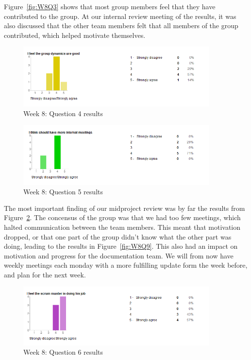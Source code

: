 Figure~\ref{fig:W8Q3} shows that most group members feel that they have contributed to the group. At our internal review meeting of the results, it was also discussed that the other team members felt that all members of the group contributed, which helped motivate themselves. 

\begin{figure}[th!]
\centering
\includegraphics[width=0.9\textwidth]{evaluation/week_8_images/group_dynamics}
\caption{Week 8: Question 4 results}
\label{fig:W8Q4}
\end{figure}

\begin{figure}[th!]
\centering
\includegraphics[width=0.9\textwidth]{evaluation/week_8_images/internal_meetings}
\caption{Week 8: Question 5 results}
\label{fig:W8Q5}
\end{figure}
 The most important finding of our midproject review was by far the results from Figure~\ref{fig:W8Q5}. The concensus of the group was that we had too few meetings, which halted communication between the team members. This meant that motivation dropped, or that one part of the group didn't know what the other part was doing, leading to the results in Figure~\ref{fig:W8Q9}. This also had an impact on motivation and progress for the documentation team. We will from now have weekly meetings each monday with a more fulfilling update form the week before, and plan for the next week.

\begin{figure}[th!]
\centering
\includegraphics[width=0.9\textwidth]{evaluation/week_8_images/scrum_master}
\caption{Week 8: Question 6 results}
\label{fig:W8Q6}
\end{figure}

